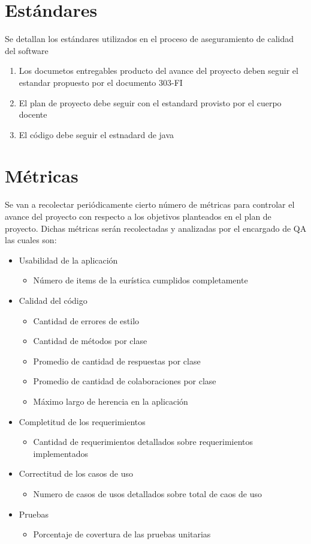 \section{Estándares}
Se detallan los estándares utilizados en el proceso de aseguramiento de calidad del software
\begin{enumerate}
    \item Los documetos entregables producto del avance del proyecto deben seguir el estandar propuesto por el documento 303-FI
    \item El plan de proyecto debe seguir con el estandard provisto por el cuerpo docente
    \item El código debe seguir el estnadard de java
\end{enumerate}

\section{Métricas}
Se van a recolectar periódicamente cierto número de métricas para controlar el avance del proyecto con respecto a los objetivos planteados en el plan de proyecto. Dichas métricas serán recolectadas y analizadas por el encargado de QA las cuales son:

\begin{itemize}
    \item Usabilidad de la aplicación
    \begin{itemize}
        \item Número de items de la eurística cumplidos completamente
    \end{itemize}
    \item Calidad del código
    \begin{itemize}
        \item Cantidad de errores de estilo
        \item Cantidad de métodos por clase
        \item Promedio de cantidad de respuestas por clase
        \item Promedio de cantidad de colaboraciones por clase
        \item Máximo largo de herencia en la aplicación
    \end{itemize}
    \item Completitud de los requerimientos
    \begin{itemize}
        \item Cantidad de requerimientos detallados sobre requerimientos implementados
    \end{itemize}
    \item Correctitud de los casos de uso
    \begin{itemize}
        \item Numero de casos de usos detallados sobre total de caos de uso
    \end{itemize}
    \item Pruebas
    \begin{itemize}
        \item Porcentaje de covertura de las pruebas unitarias
    \end{itemize}
\end{itemize}

